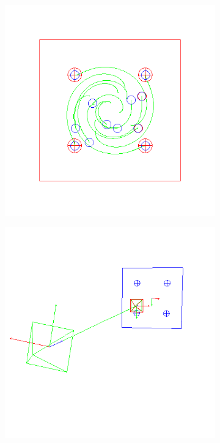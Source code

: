 \begin{figure}[ht!]
\centering
  \centering
  \begin{subfigure}{.48\linewidth}
    \centering
    \includegraphics[width=\linewidth]{figures/plots/ex4cimage.png}
    \caption{}
    \label{fig:ex4cimage}
  \end{subfigure}
  \begin{subfigure}{.48\linewidth}
    \centering
    \includegraphics[width=\linewidth]{figures/plots/ex4cscene.png}

\end{subfigure}
\end{figure}

